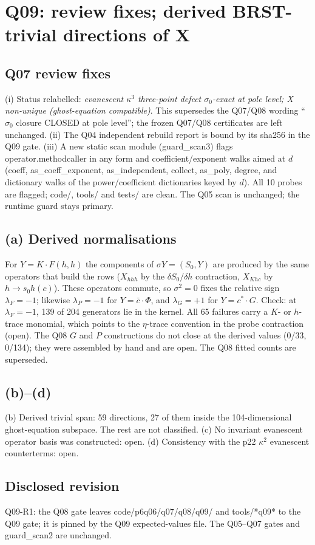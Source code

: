 \section{Q09: review fixes; derived BRST-trivial directions of X}
\subsection*{Q07 review fixes}
(i) Status relabelled: \emph{evanescent $\kappa^3$ three-point defect $\sigma_0$-exact at pole level; X non-unique
(ghost-equation compatible)}. This supersedes the Q07/Q08 wording ``$\sigma_0$ closure CLOSED at pole level''; the
frozen Q07/Q08 certificates are left unchanged. (ii) The Q04 independent rebuild report is bound by its sha256 in the
Q09 gate. (iii) A new static scan module (guard\_scan3) flags operator.methodcaller in any form and
coefficient/exponent walks aimed at $d$ (coeff, as\_coeff\_exponent, as\_independent, collect, as\_poly, degree,
and dictionary walks of the power/coefficient dictionaries keyed by $d$). All 10 probes are flagged; code/, tools/ and
tests/ are clean. The Q05 scan is unchanged; the runtime guard stays primary.
\subsection*{(a) Derived normalisations}
For $Y=K\cdot F(h,h)$ the components of $\sigma Y=(S_0,Y)$ are produced by the same operators that build the rows
($X_{hhh}$ by the $\delta S_0/\delta h$ contraction, $X_{Khc}$ by $h\to s_0h(c)$). These operators commute, so
$\sigma^2=0$ fixes the relative sign $\lambda_F=-1$; likewise $\lambda_P=-1$ for $Y=\bar c\cdot\Phi$, and $\lambda_G=+1$ for
$Y=c^*\cdot G$. Check: at $\lambda_F=-1$, 139 of 204 generators lie in the kernel. All 65 failures carry a $K$- or
$h$-trace monomial, which points to the $\eta$-trace convention in the probe contraction (open). The Q08 $G$ and
$P$ constructions do not close at the derived values (0/33, 0/134); they were assembled by hand and are open. The
Q08 fitted counts are superseded.
\subsection*{(b)--(d)}
(b) Derived trivial span: 59 directions, 27 of them inside the 104-dimensional ghost-equation subspace. The rest are
not classified. (c) No invariant evanescent operator basis was constructed: open. (d) Consistency with the p22
$\kappa^2$ evanescent counterterms: open.
\subsection*{Disclosed revision}
Q09-R1: the Q08 gate leaves code/p6q06/q07/q08/q09/ and tools/*q09* to the Q09 gate; it is pinned by the Q09
expected-values file. The Q05--Q07 gates and guard\_scan2 are unchanged.

